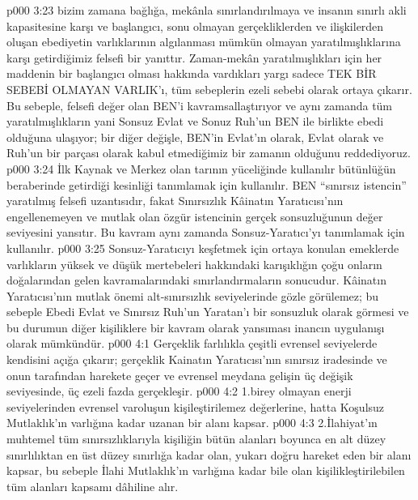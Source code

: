 \vs p000 3:23 bizim zamana bağlığa, mekânla sınırlandırılmaya ve insanın sınırlı akli kapasitesine karşı ve başlangıcı, sonu olmayan gerçekliklerden ve ilişkilerden oluşan ebediyetin varlıklarının algılanması mümkün olmayan yaratılmışlıklarına karşı getirdiğimiz felsefi bir yanıttır. Zaman\hyp{}mekân yaratılmışlıkları için her maddenin bir başlangıcı olması hakkında vardıkları yargı sadece TEK BİR SEBEBİ OLMAYAN VARLIK’ı, tüm sebeplerin ezeli sebebi olarak ortaya çıkarır. Bu sebeple, felsefi değer olan BEN’i kavramsallaştırıyor ve aynı zamanda tüm yaratılmışlıkların yani Sonsuz Evlat ve Sonuz Ruh’un BEN ile birlikte ebedi olduğuna ulaşıyor; bir diğer değişle, BEN’in Evlat’ın  olarak, Evlat olarak ve Ruh’un bir parçası olarak kabul etmediğimiz bir zamanın olduğunu reddediyoruz.
\vs p000 3:24 İlk Kaynak ve Merkez olan tarının yüceliğinde kullanılır bütünlüğün beraberinde getirdiği kesinliği tanımlamak için kullanılır.  BEN “sınırsız istencin” yaratılmış felsefi uzantısıdır, fakat Sınırsızlık Kâinatın Yaratıcısı’nın engellenemeyen ve mutlak olan özgür istencinin gerçek sonsuzluğunun  değer seviyesini yansıtır. Bu kavram aynı zamanda Sonsuz\hyp{}Yaratıcı’yı tanımlamak için kullanılır.
\vs p000 3:25 Sonsuz\hyp{}Yaratıcıyı keşfetmek için ortaya konulan emeklerde varlıkların yüksek ve düşük mertebeleri hakkındaki karışıklığın çoğu onların doğalarından gelen kavramalarındaki sınırlandırmaların sonucudur. Kâinatın Yaratıcısı’nın mutlak önemi alt\hyp{}sınırsızlık seviyelerinde gözle görülemez; bu sebeple Ebedi Evlat ve Sınırsız Ruh’un Yaratan’ı bir sonsuzluk olarak görmesi ve bu durumun diğer kişiliklere bir kavram olarak yansıması inancın uygulanışı olarak mümkündür.
\vs p000 4:1 Gerçeklik farlılıkla çeşitli evrensel seviyelerde kendisini açığa çıkarır; gerçeklik Kainatın Yaratıcısı’nın sınırsız iradesinde ve onun tarafından harekete geçer ve evrensel meydana gelişin üç değişik seviyesinde, üç ezeli fazda gerçekleşir.
\vs p000 4:2 1.\bibnobreakspace {}birey olmayan enerji seviyelerinden evrensel varoluşun kişileştirilemez değerlerine, hatta Koşulsuz Mutlaklık’ın varlığına kadar uzanan bir alanı kapsar.
\vs p000 4:3 2.\bibnobreakspace {}İlahiyat’ın muhtemel tüm sınırsızlıklarıyla kişiliğin bütün alanları boyunca en alt düzey sınırlılıktan en üst düzey sınırlığa kadar olan, yukarı doğru hareket eden bir alanı kapsar, bu sebeple İlahi Mutlaklık’ın varlığına kadar bile olan kişilikleştirilebilen tüm alanları kapsamı dâhiline alır.
